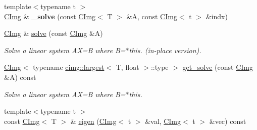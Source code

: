 \begin{DoxyCompactItemize}
\item 
\hypertarget{structcimg__library_1_1_c_img_af951c49d7ae02d9cbc656bc679ee6487}{
{\footnotesize template$<$typename t $>$ }\\\hyperlink{structcimg__library_1_1_c_img}{CImg} \& {\bfseries \_\-solve} (const \hyperlink{structcimg__library_1_1_c_img}{CImg}$<$ T $>$ \&A, const \hyperlink{structcimg__library_1_1_c_img}{CImg}$<$ t $>$ \&indx)}
\label{structcimg__library_1_1_c_img_af951c49d7ae02d9cbc656bc679ee6487}

\item 
\hypertarget{structcimg__library_1_1_c_img_ace9bdf1b50ca9caab1c5d3c7707d80b1}{
\hyperlink{structcimg__library_1_1_c_img}{CImg} \& \hyperlink{structcimg__library_1_1_c_img_ace9bdf1b50ca9caab1c5d3c7707d80b1}{solve} (const \hyperlink{structcimg__library_1_1_c_img}{CImg} \&A)}
\label{structcimg__library_1_1_c_img_ace9bdf1b50ca9caab1c5d3c7707d80b1}

\begin{DoxyCompactList}\small\item\em Solve a linear system AX=B where B=$\ast$this. (in-\/place version). \item\end{DoxyCompactList}\item 
\hypertarget{structcimg__library_1_1_c_img_aa41ea9269466a654b9a23e5e56f3a22f}{
\hyperlink{structcimg__library_1_1_c_img}{CImg}$<$ typename \hyperlink{structcimg__library_1_1cimg_1_1largest}{cimg::largest}$<$ T, float $>$::type $>$ \hyperlink{structcimg__library_1_1_c_img_aa41ea9269466a654b9a23e5e56f3a22f}{get\_\-solve} (const \hyperlink{structcimg__library_1_1_c_img}{CImg} \&A) const }
\label{structcimg__library_1_1_c_img_aa41ea9269466a654b9a23e5e56f3a22f}

\begin{DoxyCompactList}\small\item\em Solve a linear system AX=B where B=$\ast$this. \item\end{DoxyCompactList}\item 
\hypertarget{structcimg__library_1_1_c_img_a3d6fb4c9d4dc7289e360ec9b08e3ea54}{
{\footnotesize template$<$typename t $>$ }\\const \hyperlink{structcimg__library_1_1_c_img}{CImg}$<$ T $>$ \& \hyperlink{structcimg__library_1_1_c_img_a3d6fb4c9d4dc7289e360ec9b08e3ea54}{eigen} (\hyperlink{structcimg__library_1_1_c_img}{CImg}$<$ t $>$ \&val, \hyperlink{structcimg__library_1_1_c_img}{CImg}$<$ t $>$ \&vec) const }
\label{structcimg__library_1_1_c_img_a3d6fb4c9d4dc7289e360ec9b08e3ea54}


\end{DoxyCompactItemize}
